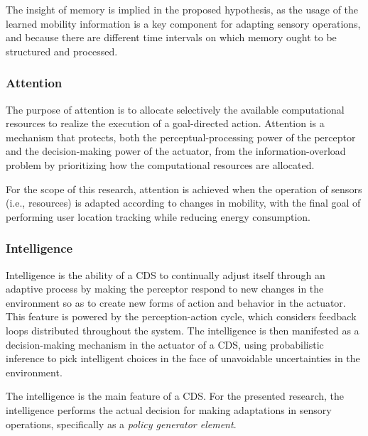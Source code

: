 \documentclass[ENG,PhD]{cinvestav}
\begin{document}
The insight of memory is implied in the proposed hypothesis, as the usage of the learned mobility information is a key component for adapting sensory operations, and because there are different time intervals on which memory ought to be structured and processed.

\subsubsection*{Attention}
The purpose of attention is to allocate selectively the available computational resources to realize the execution of a goal-directed action.
Attention is a mechanism that protects, both the perceptual-processing power of the perceptor and the decision-making power of the actuator, from the information-overload problem by prioritizing how the computational resources are allocated.

For the scope of this research, attention is achieved when the operation of sensors (i.e., resources) is adapted according to changes in mobility, with the final goal of performing user location tracking while reducing energy consumption.

\subsubsection*{Intelligence}
Intelligence is the ability of a CDS to continually adjust itself through an adaptive process by making the perceptor respond to new changes in the environment so as to create new forms of action and behavior in the actuator.
This feature is powered by the perception-action cycle, which considers feedback loops distributed throughout the system.
The intelligence is then manifested as a decision-making mechanism in the actuator of a CDS, using probabilistic inference to pick intelligent choices in the face of unavoidable uncertainties in the environment.

The intelligence is the main feature of a CDS.
For the presented research, the intelligence performs the actual decision for making adaptations in sensory operations, specifically as a \emph{policy generator element}.

\end{document}
